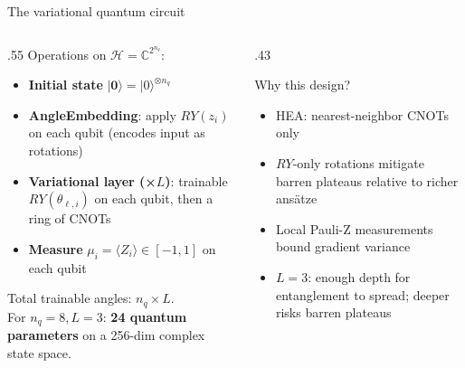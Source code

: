 \begin{frame}{The variational quantum circuit}
    \begin{columns}[T]
    \begin{column}{.55\textwidth}
        Operations on $\mathcal{H} = \mathbb{C}^{2^{n_q}}$:
        \medskip

        \begin{itemize}
            \item \textbf{Initial state} $|\mathbf{0}\rangle = |0\rangle^{\otimes n_q}$
            \item \textbf{AngleEmbedding}: apply $RY(z_i)$ on
            each qubit (encodes input as rotations)
            \item \textbf{Variational layer (×$L$)}:
            trainable $RY(\theta_{\ell,i})$ on each qubit, then
            a ring of CNOTs
            \item \textbf{Measure} $\mu_i = \langle Z_i\rangle
            \in [-1,1]$ on each qubit
        \end{itemize}
        \medskip

        Total trainable angles: $n_q \times L$.\\
        For $n_q=8, L=3$: \textbf{24 quantum parameters} on a
        256-dim complex state space.
    \end{column}
    \hfill
    \begin{column}{.43\textwidth}
        \begin{block}{Why this design?}
            \begin{itemize}
                \item HEA: nearest-neighbor
                CNOTs only
                \item $RY$-only rotations mitigate barren
                plateaus relative to richer ansätze~\cite{McClean2018BarrenPlateaus}
                \item Local Pauli-Z measurements bound gradient variance~\cite{Cerezo2021LocalCost}
                \item $L=3$: enough depth for entanglement to spread; deeper risks barren plateaus
            \end{itemize}
        \end{block}
    \end{column}
    \end{columns}
\end{frame}
